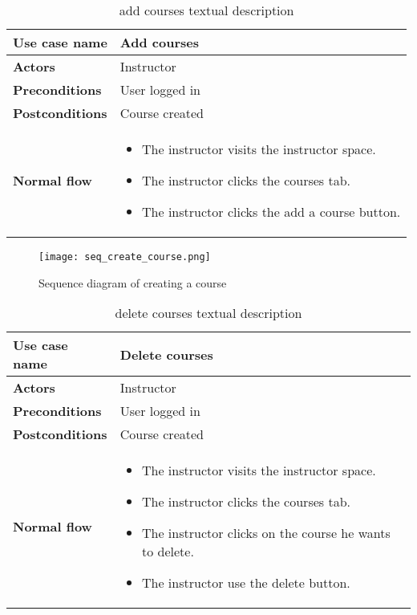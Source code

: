 \begin{table}[H]
\centering
\caption{add courses textual description}
\begin{tabular}{|p{4cm}|p{10cm}|}
\hline
\textbf{\large{Use case name}} & Add courses \\\hline
\textbf{\large{Actors}} & Instructor \\\hline
\textbf{\large{Preconditions}} & User logged in \\\hline
\textbf{\large{Postconditions}} & Course created  \\\hline
\textbf{\large{Normal flow}} & 
\begin{itemize}
  \item The instructor visits the instructor space.
  \item The instructor clicks the courses tab.
  \item The instructor clicks the add a course button.
\end{itemize}
\\\hline

\end{tabular}
\end{table}

\begin{figure}[!ht]
    \centering
    \texttt{[image: seq\_create\_course.png]}
    \caption{Sequence diagram of creating a course}
    \label{fig:seq_create_course}
\end{figure}


\begin{table}[H]
\centering
\caption{delete courses textual description}
\begin{tabular}{|p{4cm}|p{10cm}|}
\hline
\textbf{\large{Use case name}} & Delete courses \\\hline
\textbf{\large{Actors}} & Instructor \\\hline
\textbf{\large{Preconditions}} & User logged in \\\hline
\textbf{\large{Postconditions}} & Course created  \\\hline
\textbf{\large{Normal flow}} & 
\begin{itemize}
  \item The instructor visits the instructor space.
  \item The instructor clicks the courses tab.
  \item The instructor clicks on the course he wants to delete.
  \item The instructor use the delete button.
\end{itemize}
\\\hline

\end{tabular}
\end{table}

